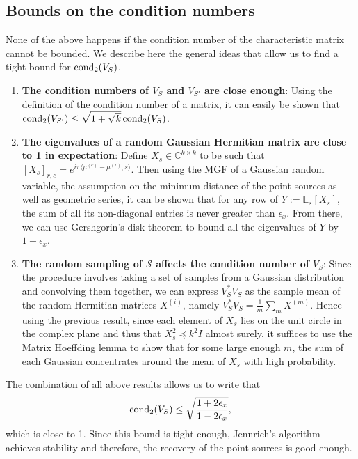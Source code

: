 \subsection{Bounds on the condition numbers}
None of the above happens if the condition number of the characteristic matrix cannot be bounded. We describe here the general ideas that allow us to find a tight bound for $\operatorname*{cond_2}(V_S)$.
\begin{enumerate}
    \item {\bf The condition numbers of $V_S$ and $V_{S'}$ are close enough}: Using the definition of the condition number of a matrix, it can easily be shown that $\operatorname*{cond_2}(V_{S'})\leq\sqrt{1+\sqrt{k}}\operatorname*{cond_2}(V_S)$.
    \item {\bf The eigenvalues of a random Gaussian Hermitian matrix are close to 1 in expectation}: Define $X_s\in\mathbb{C}^{k\times k}$ to be such that $[X_s]_{r,c}=e^{i\pi\langle\mu^{(c)}-\mu^{(r)},s\rangle}$. Then using the MGF of a Gaussian random variable, the assumption on the minimum distance of the point sources as well as geometric series, it can be shown that for any row of $Y:=\mathbb{E}_s[X_s]$, the sum of all its non-diagonal entries is never greater than $\epsilon_x$. From there, we can use Gershgorin's disk theorem to bound all the eigenvalues of $Y$ by $1\pm\epsilon_x$.
    \item {\bf The random sampling of $\mathcal{S}$ affects the condition number of $V_S$}: Since the procedure involves taking a set of samples from a Gaussian distribution and convolving them together, we can express $V_S^*V_S$ as the sample mean of the random Hermitian matrices $X^{(i)}$, namely $V_S^*V_S=\frac{1}{m}\sum_m X^{(m)}$. Hence using the previous result, since each element of $X_s$ lies on the unit circle in the complex plane and thus that $X_s^2\preceq k^2 I$ almost surely, it suffices to use the Matrix Hoeffding lemma to show that for some large enough $m$, the sum of each Gaussian concentrates around the mean of $X_s$ with high probability.
\end{enumerate}
The combination of all above results allows us to write that $$\operatorname*{cond_2}(V_S)\leq\sqrt{\frac{1+2\epsilon_x}{1-2\epsilon_x}},$$ which is close to 1. Since this bound is tight enough, Jennrich's algorithm achieves stability and therefore, the recovery of the point sources is good enough.